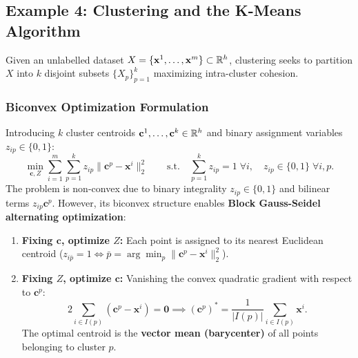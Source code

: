 \subsection{Example 4: Clustering and the K-Means Algorithm}
Given an unlabelled dataset $X = \{\mathbf{x}^1, \dots, \mathbf{x}^m\} \subset \mathbb{R}^h$, clustering seeks to partition $X$ into $k$ disjoint subsets $\{X_p\}_{p=1}^k$ maximizing intra-cluster cohesion.

\subsubsection{Biconvex Optimization Formulation}
Introducing $k$ cluster centroids $\mathbf{c}^1, \dots, \mathbf{c}^k \in \mathbb{R}^h$ and binary assignment variables $z_{ip} \in \{0, 1\}$:
\begin{equation}
    \min_{\mathbf{c}, Z} \sum_{i=1}^m \sum_{p=1}^k z_{ip} \|\mathbf{c}^p - \mathbf{x}^i\|_2^2 \qquad \text{s.t.} \quad \sum_{p=1}^k z_{ip} = 1 \; \forall i, \quad z_{ip} \in \{0, 1\} \; \forall i,p.
\end{equation}
The problem is non-convex due to binary integrality $z_{ip} \in \{0, 1\}$ and bilinear terms $z_{ip}\mathbf{c}^p$. However, its biconvex structure enables \textbf{Block Gauss-Seidel alternating optimization}:
\begin{enumerate}
    \item \textbf{Fixing $\mathbf{c}$, optimize $Z$:} Each point is assigned to its nearest Euclidean centroid ($z_{i\bar{p}} = 1 \iff \bar{p} = \arg\min_p \|\mathbf{c}^p - \mathbf{x}^i\|_2^2$).
    \item \textbf{Fixing $Z$, optimize $\mathbf{c}$:} Vanishing the convex quadratic gradient with respect to $\mathbf{c}^p$:
    \begin{equation}
        2 \sum_{i \in I(p)} (\mathbf{c}^p - \mathbf{x}^i) = \mathbf{0} \implies (\mathbf{c}^p)^* = \frac{1}{|I(p)|} \sum_{i \in I(p)} \mathbf{x}^i.
    \end{equation}
    The optimal centroid is the \textbf{vector mean (barycenter)} of all points belonging to cluster $p$.
\end{enumerate}

